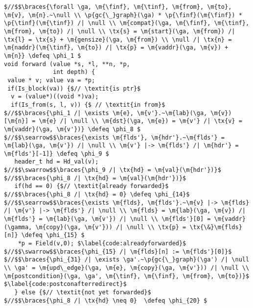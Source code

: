 \documentclass[acmsmall,review,anonymous]{acmart}\settopmatter{printfolios=true,printccs=false,printacmref=false}
\newcommand{\defeq}{\mathbin{\stackrel{\Delta}{=}}}
\newcommand{\tx}[1]{\text{#1}}
\newcommand{\p}[1]{\ensuremath{\mathsf{#1}}} \newcommand{\m}[1]{\ensuremath{\mathit{#1}}} \newcommand{\ma}[1]{\ensuremath{\mathcal{#1}}} \let\ramify\lightning
\begin{document}
\begin{figure*}[!ht]
\vspace{-1ex}
  \begin{lstlisting}[multicols=2]
$//$$\braces{\forall \ga, \m{\finf}, \m{\tinf}, \m{from}, \m{to}, \m{v}, \m{n}.~\null \\ \p{gc{\_}graph}(\ga) * \p{\finf}(\m{\finf}) * \p{\tinf}(\m{\tinf}) /| \null \\ \m{compat}(\ga, \m{\finf}, \m{\tinf}, \m{from}, \m{to}) /| \null \\ \tx{s} = \m{start}(\ga, \m{from}) /| \tx{l} = \tx{s} + \m{gensize}(\ga, \m{from}) \\ \null /| \tx{n} = \m{naddr}(\m{\tinf}, \m{to}) /| \tx{p} = \m{vaddr}(\ga, \m{v}) + \m{n}} \defeq \phi_1 $
void forward (value *s, *l, **n, *p, 
              int depth) {
 value * v; value va = *p; 
 if(Is_block(va)) {$// \textit{is ptr}$
  v = (value*)((void *)va); 
  if(Is_from(s, l, v)) {$ // \textit{in from}$
$//$$\braces{\phi_1 /| \exists \m{e}, \m{v'}.~\m{lab}(\ga, \m{v})[\m{n}] = \m{e} /| \null \\ \m{dst}(\ga, \m{e}) = \m{v'} /| \tx{v} = \m{vaddr}(\ga, \m{v'})} \defeq \phi_8 $
$//$$\searrow$$\braces{\exists \m{flds'}, \m{hdr'}.~\m{flds'} = \m{lab}(\ga, \m{v'}) /| \null \\ \m{v'} |-> \m{flds'} /| \m{hdr'} = \m{flds'}[-1]} \defeq \phi_9 $
   header_t hd = Hd_val(v);
$//$$\swarrow$$\braces{\phi_9 /| \tx{hd} = \m{val}(\m{hdr'})}$
$//$$\braces{\phi_8 /| \tx{hd} = \m{val}(\m{hdr'})}$ 
   if(hd == 0) {$// \textit{already forwarded}$
$//$$\braces{\phi_8 /| \tx{hd} = 0} \defeq \phi_{14}$ 
$//$$\searrow$$\braces{\exists \m{flds}, \m{flds'}.~\m{v} |-> \m{flds} /| \m{v'} |-> \m{flds'} /| \null \\ \m{flds} = \m{lab}(\ga, \m{v}) /| \m{flds'} = \m{lab}(\ga, \m{v'}) /| \null \\ \m{flds'}[0] = \m{vaddr}(\gamma, \m{copy}(\ga, \m{v'})) /| \null \\ \tx{p} = \tx{\&}\m{flds}[n]} \defeq \phi_{15} $
    *p = Field(v,0); $\label{code:alreadyforwarded}$
$//$$\swarrow$$\braces{\phi_{15} /| \m{flds}[n] := \m{flds'}[0]}$
$//$$\braces{\phi_{31} /| \exists \ga'.~\p{gc{\_}graph}(\ga') /| \null \\ \ga' = \m{upd\_edge}(\ga, \m{e}, \m{copy}(\ga, \m{v'})) /| \null \\ \m{postcondition}(\ga, \ga', \m{\tinf}, \m{\finf}, \m{from}, \m{to})}$ $\label{code:postconafterredirect}$
   } else {$// \textit{not yet forwarded}$
$//$$\braces{\phi_8 /| \tx{hd} \neq 0}  \defeq \phi_{20} $

\end{lstlisting}
\end{figure*}
\end{document}
